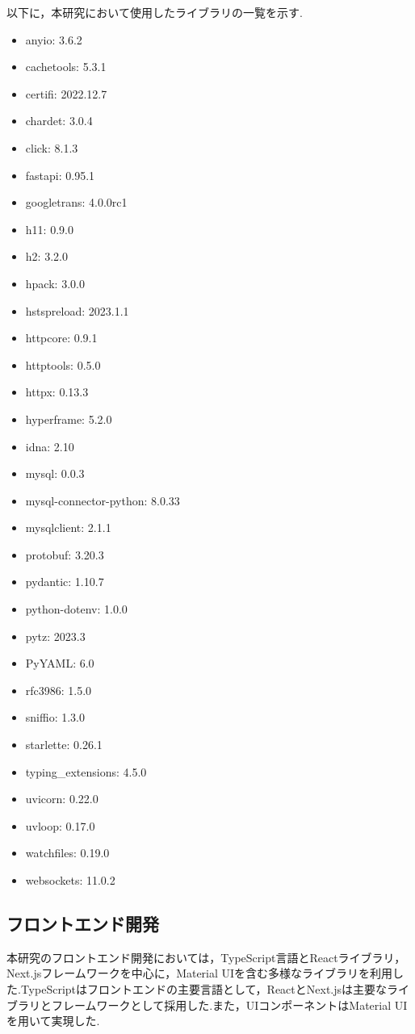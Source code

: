 \documentclass[b5paper,12pt,dvipdfmx]{jsreport}
\begin{document}
以下に，本研究において使用したライブラリの一覧を示す.
\begin{itemize}
    \item anyio: 3.6.2
    \item cachetools: 5.3.1
    \item certifi: 2022.12.7
    \item chardet: 3.0.4
    \item click: 8.1.3
    \item fastapi: 0.95.1
    \item googletrans: 4.0.0rc1
    \item h11: 0.9.0
    \item h2: 3.2.0
    \item hpack: 3.0.0
    \item hstspreload: 2023.1.1
    \item httpcore: 0.9.1
    \item httptools: 0.5.0
    \item httpx: 0.13.3
    \item hyperframe: 5.2.0
    \item idna: 2.10
    \item mysql: 0.0.3
    \item mysql-connector-python: 8.0.33
    \item mysqlclient: 2.1.1
    \item protobuf: 3.20.3
    \item pydantic: 1.10.7
    \item python-dotenv: 1.0.0
    \item pytz: 2023.3
    \item PyYAML: 6.0
    \item rfc3986: 1.5.0
    \item sniffio: 1.3.0
    \item starlette: 0.26.1
    \item typing\_extensions: 4.5.0
    \item uvicorn: 0.22.0
    \item uvloop: 0.17.0
    \item watchfiles: 0.19.0
    \item websockets: 11.0.2
\end{itemize}


\subsection{フロントエンド開発}
本研究のフロントエンド開発においては，TypeScript言語とReactライブラリ，Next.jsフレームワークを中心に，Material UIを含む多様なライブラリを利用した.TypeScriptはフロントエンドの主要言語として，ReactとNext.jsは主要なライブラリとフレームワークとして採用した.また，UIコンポーネントはMaterial UIを用いて実現した.
\end{document}
